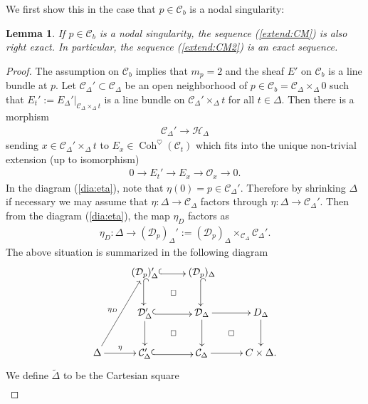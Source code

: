 \documentclass[11pt,oneside,a4paper,mathscr]{amsart}
\makeatletter
\newtheorem{lemma}[thm]{Lemma}
\theoremstyle{definition}
\newcommand{\cH}{\mathcal{H}}
\newcommand{\cC}{\mathcal{C}}
\newcommand{\cD}{\mathcal{D}}
\newcommand{\diasquare}{\ar@{}[rd]|\square}
\newcommand{\Coh}{\operatorname{Coh}}
\newcommand{\inclusion}{\ar@<-0.3ex>@{^{(}->}[r]}
\newcommand{\dinclusion}{\ar@<-0.3ex>@{^{(}->}[d]}
\makeatother
\begin{document}
We first show this in the case that $p\in \cC_b$ is a nodal singularity: 
\begin{lemma}\label{lem:nodal}
If $p\in \cC_b$ is a nodal singularity, the 
sequence (\ref{extend:CM}) is also right exact. In particular, the sequence (\ref{extend:CM2}) is an exact sequence. 
\end{lemma}
\begin{proof}
    The assumption on $\cC_b$ implies that 
    $m_p=2$ and 
    the sheaf $E'$ on $\cC_b$ is a line bundle at $p$. Let $\cC_{\Delta}'\subset \cC_{\Delta}$ be an open neighborhood of $p \in \cC_b=\cC_{\Delta}\times_{\Delta}0$ such that 
    $E_t':=E_{\Delta}'|_{\cC_{\Delta}\times_{\Delta}t}$ is a line bundle on $\cC_{\Delta}'\times_{\Delta} t$
    for all $t\in \Delta$. 
    Then there is a morphism 
    \begin{align}\label{mor:circ}
\cC_{\Delta}' \to \cH_{\Delta}
    \end{align}
    sending $x\in \cC_{\Delta}'\times_{\Delta}t$ 
    to $E_x \in \Coh^{\heartsuit}(\cC_t)$ which fits into 
    the unique non-trivial extension (up to isomorphism)
    \begin{align*}
        0\to E_t' \to E_x \to \mathcal{O}_x \to 0. 
    \end{align*}
In the diagram (\ref{dia:eta}), note that $\eta(0)=p\in \cC_{\Delta}'$. 
Therefore by shrinking $\Delta$ if necessary we may assume that 
    $\eta \colon \Delta \to \cC_{\Delta}$ factors through 
    $\eta \colon \Delta \to \cC_{\Delta}'$.
    Then from the diagram (\ref{dia:eta}), 
    the map $\eta_D$ factors as 
    \begin{align*}
        \eta_D \colon \Delta \to (\cD_p)_{\Delta}':=(\cD_p)_{\Delta}\times_{\cC_{\Delta}}\cC_{\Delta}'.
        \end{align*}
The above situation is summarized in the following diagram 
    \begin{align}\label{dia:Dpprime}
        \xymatrix{
&(\cD_p)_{\Delta}' \inclusion \dinclusion \diasquare & (\cD_p)_{\Delta} \dinclusion  & \\
&\cD_{\Delta}' \inclusion \ar[d] \diasquare & \cD_{\Delta} \ar[r] \ar[d] \diasquare & D_{\Delta} \ar[d] \\
\Delta \ar[r]^-{\eta} \ar[ruu]^-{\eta_D} &\cC_{\Delta}' \inclusion & \cC_{\Delta} \ar[r] & C\times \Delta.  
        }
    \end{align}
 We define 
    $\widetilde{\Delta}$ to be the Cartesian square 
    \begin{align}\label{dia:tdelta}

\end{align}
\end{proof}
\end{document}
